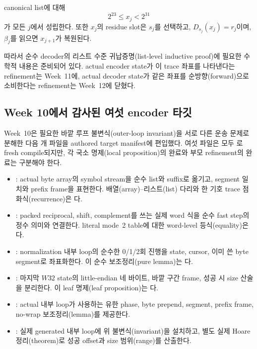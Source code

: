 \begin{verified}
canonical list에 대해
\[
  2^{23}\le x_j<2^{31}
\]
가 모든 \(j\)에서 성립한다. 또한 \(x_j\)의 residue slot은 \(s_j\)를 선택하고,
\(D_{s_j}(x_j)=r_j\)이며, \(\beta_j\)를 읽으면 \(x_{j+1}\)가 복원된다.
\end{verified}

따라서 순수 decoder의 리스트 수준 귀납증명(list-level inductive proof)에 필요한
수학적 내용은 준비되어 있다. actual encoder state가 이 trace 좌표를
나타낸다는 refinement는 Week~11에, actual decoder state가 같은 좌표를
순방향(forward)으로 소비한다는 refinement는 Week~12에 닫혔다.

\subsection{Week 10에서 감사된 여섯 encoder 타깃}

Week~10은 필요한 바깥 루프 불변식(outer-loop invariant)을 서로 다른 운송
문제로 분해한 다음 \WeekTenTargetCount 개 파일을 authored target manifest에
편입했다. 여섯 파일은 모두 로 fresh compile되지만, 각
국소 명제(local proposition)의 완료와 부모 refinement의 완료는 구분해야 한다.

\begin{itemize}
  \item {}: actual byte array의 symbol
        stream을 순수 list와 suffix로 옮기고, segment 일치와 prefix frame을
        표현한다. 배열(array)--리스트(list) 다리와 한 기호 trace
        점화식(recurrence)은 \statusproved 다.
  \item {}: packed reciprocal, shift,
        complement를 쓰는 실제 word 식을 순수 fast step의 정수 의미와
        연결한다. literal mode~2 table에 대한 word-level 등식(equality)은
        \statusproved 다.
  \item {}: normalization 내부
        loop의 순수한 0/1/2회 진행을 state, cursor, 이미 쓴 byte segment로
        좌표화한다. 이 순수 보조정리(pure lemma)는 \statusproved 다.
  \item {}: 마지막 \(W32\) state의
        little-endian 네 바이트, 바깥 구간 frame, 성공 시 size 산술을 분리한다.
        이 leaf 명제(leaf proposition)는 \statusproved 다.
  \item {}: actual
        내부 loop가 사용하는 유한 phase, byte prepend, segment, prefix frame,
        no-wrap 보조정리(lemma)를 제공한다.
  \item {}: 실제 generated
         내부 loop에 위 불변식(invariant)을 설치하고,
        별도 실제 Hoare 정리(theorem)로 성공 offset과 size 범위(range)를
        산출한다.
\end{itemize}


